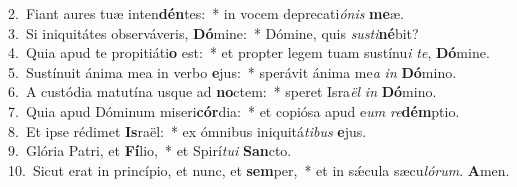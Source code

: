 {2.~}Fiant aures tuæ inten\textbf{dén}tes:~* in vocem deprecati\textit{ó}\textit{nis} \textbf{me}æ.\\
{3.~}Si iniquitátes observáveris, \textbf{Dó}mine:~* Dómine, quis \textit{su}\textit{sti}\textbf{né}bit?\\
{4.~}Quia apud te propitiáti\textbf{o} est:~* et propter legem tuam sustínu\textit{i} \textit{te}, \textbf{Dó}mine.\\
{5.~}Sustínuit ánima mea in verbo \textbf{e}jus:~* sperávit ánima me\textit{a} \textit{in} \textbf{Dó}mino.\\
{6.~}A custódia matutína usque ad \textbf{no}ctem:~* speret Isra\textit{ël} \textit{in} \textbf{Dó}mino.\\
{7.~}Quia apud Dóminum miseri\textbf{cór}dia:~* et copiósa apud e\textit{um} \textit{re}\textbf{dém}ptio.\\
{8.~}Et ipse rédimet \textbf{Is}raël:~* ex ómnibus iniquitá\textit{ti}\textit{bus} \textbf{e}jus.\\
{9.~}Glória Patri, et \textbf{Fí}lio,~* et Spirí\textit{tu}\textit{i} \textbf{San}cto.\\
{10.~}Sicut erat in princípio, et nunc, et \textbf{sem}per,~* et in sǽcula sæcu\textit{ló}\textit{rum}. \textbf{A}men.\\
